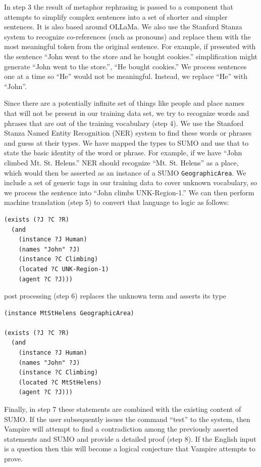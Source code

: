 \documentclass[runningheads]{llncs}
\begin{document}
In step 3 the result of metaphor rephrasing is passed to a component that attempts to simplify complex sentences into a set of shorter and simpler sentences.  It is also based around OLLaMa.  We also use the Stanford Stanza system to recognize co-references (such as pronouns) and replace them with the most meaningful token from the original sentence.  For example, if presented with the sentence ``John went to the store and he bought cookies.'' simplification might generate ``John went to the store.'', ``He bought cookies.''  We process sentences one at a time so ``He'' would not be meaningful.  Instead, we replace ``He'' with ``John''.

Since there are a potentially infinite set of things like people and place names that will not be present in our training data set, we try to recognize words and phrases that are out of the training vocabulary (step 4).  We use the Stanford Stanza Named Entity Recognition (NER) system to find these words or phrases and guess at their types.  We have mapped the types to SUMO and use that to state the basic identity of the word or phrase.  For example, if we have ``John climbed Mt. St. Helens.'' NER should recognize ``Mt. St. Helens'' as a place, which would then be asserted as an instance of a SUMO \texttt{GeographicArea}.  We include a set of generic tags in our training data to cover unknown vocabulary, so we process the sentence into ``John climbs UNK-Region-1.''  We can then perform machine translation (step 5) to convert that language to logic as follows:

\begin{verbatim}
(exists (?J ?C ?R)
  (and
    (instance ?J Human)
    (names "John" ?J)
    (instance ?C Climbing)
    (located ?C UNK-Region-1)
    (agent ?C ?J)))
\end{verbatim}

post processing (step 6) replaces the unknown term and asserts its type

\begin{verbatim}
(instance MtStHelens GeographicArea)

(exists (?J ?C ?R)
  (and
    (instance ?J Human)
    (names "John" ?J)
    (instance ?C Climbing)
    (located ?C MtStHelens)
    (agent ?C ?J)))
\end{verbatim}

Finally, in step 7 these statements are combined with the existing content of SUMO.   If the user subsequently issues the command ``test'' to the system, then Vampire will attempt to find a contradiction among the previously asserted statements and SUMO and provide a detailed proof (step 8).  If the English input is a question then this will become a logical conjecture that Vampire attempts to prove.
\end{document}
